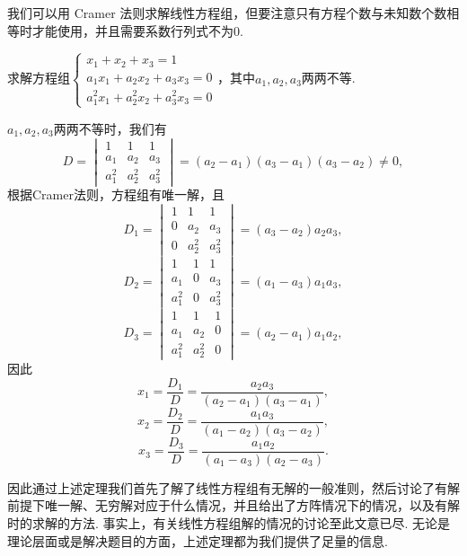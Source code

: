 我们可以用 Cramer 法则求解线性方程组，但要注意只有方程个数与未知数个数相等时才能使用，并且需要系数行列式不为0.
\begin{example}{}{}
    求解方程组$\begin{cases}
            x_1+x_2+x_3=1          \\
            a_1x_1+a_2x_2+a_3x_3=0 \\
            a_1^2x_1+a_2^2x_2+a_3^2x_3=0
        \end{cases}$，其中$a_1,a_2,a_3$两两不等.
\end{example}

\begin{solution}
    $a_1,a_2,a_3$两两不等时，我们有
    \[D=\begin{vmatrix}
            1     & 1     & 1     \\
            a_1   & a_2   & a_3   \\
            a_1^2 & a_2^2 & a_3^2
        \end{vmatrix}=(a_2-a_1)(a_3-a_1)(a_3-a_2)\neq 0,\]
    根据Cramer法则，方程组有唯一解，且
    \[D_1=\begin{vmatrix}
            1 & 1     & 1     \\
            0 & a_2   & a_3   \\
            0 & a_2^2 & a_3^2
        \end{vmatrix}=(a_3-a_2)a_2a_3,\]
    \[D_2=\begin{vmatrix}
            1     & 1 & 1     \\
            a_1   & 0 & a_3   \\
            a_1^2 & 0 & a_3^2
        \end{vmatrix}=(a_1-a_3)a_1a_3,\]
    \[D_3=\begin{vmatrix}
            1     & 1     & 1 \\
            a_1   & a_2   & 0 \\
            a_1^2 & a_2^2 & 0
        \end{vmatrix}=(a_2-a_1)a_1a_2,\]
    因此
    \[x_1=\dfrac{D_1}{D}=\dfrac{a_2a_3}{(a_2-a_1)(a_3-a_1)},\]\[x_2=\dfrac{D_2}{D}=\dfrac{a_1a_3}{(a_1-a_2)(a_3-a_2)},\]\[x_3=\dfrac{D_3}{D}=\dfrac{a_1a_2}{(a_1-a_3)(a_2-a_3)}.\]
\end{solution}

因此通过上述定理我们首先了解了线性方程组有无解的一般准则，然后讨论了有解前提下唯一解、无穷解对应于什么情况，并且给出了方阵情况下的情况，以及有解时的求解的方法. 事实上，有关线性方程组解的情况的讨论至此文意已尽. 无论是理论层面或是解决题目的方面，上述定理都为我们提供了足量的信息.


